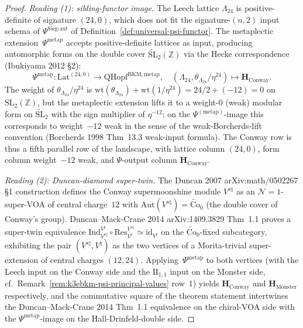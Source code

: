 \begin{proof}[Proof]
\emph{Reading (1): sibling-functor image.}
The Leech lattice $\Lambda_{24}$ is positive-definite of signature
$(24,0)$, which does not fit the signature-$(n,2)$ input schema of
$\Psi^{\mathrm{Sieg\text{-}aut}}$ of
Definition~\ref{def:universal-psi-functor}. The
metaplectic extension~$\Psi^{\mathrm{metap}}$ accepts
positive-definite lattices as input, producing automorphic forms
on the double cover $\widetilde{\mathrm{SL}}_2(\mathbb{Z})$ via the
Hecke correspondence (Ibukiyama 2012 \S 2):
\[
 \Psi^{\mathrm{metap}}:
 \mathrm{Lat}^{(24,0)} \to \mathrm{QHopf}^{\mathrm{BKM,metap}},
 \quad
 (\Lambda_{24}, \theta_{\Lambda_{24}}/\eta^{24}) \mapsto
 \mathbf{H}_{\mathrm{Conway}}.
\]
The weight of $\theta_{\Lambda_{24}}/\eta^{24}$ is
$\mathrm{wt}(\theta_{\Lambda_{24}}) + \mathrm{wt}(1/\eta^{24}) =
24/2 + (-12) = 0$ on $\mathrm{SL}_2(\mathbb{Z})$, but the
metaplectic extension lifts it to a weight-$0$ (weak) modular form
on $\widetilde{\mathrm{SL}}_2$ with the sign multiplier of
$\eta^{-12}$; on the $\Psi^{(\mathrm{metap})}$-image this corresponds
to weight~$-12$ weak in the sense of the weak-Borcherds-lift
convention (Borcherds 1998 Thm~13.3 weak-input formula). The
Conway row is thus a fifth parallel row of the landscape, with
lattice column $(24,0)$, form column weight~$-12$ weak, and
$\Psi$-output column $\mathbf{H}_{\mathrm{Conway}}$.

\emph{Reading (2): Duncan-diamond super-twin.}
The Duncan 2007 arXiv:math/0502267 \S 1 construction defines the
Conway supermoonshine module $V^{s\natural}$ as an
$\mathcal{N} = 1$-super-VOA of central charge~$12$ with
$\mathrm{Aut}(V^{s\natural}) = \widetilde{\mathrm{Co}}_0$
(the double cover of Conway's group). Duncan--Mack-Crane 2014
arXiv:1409.3829 Thm~1.1 proves a super-twin equivalence
$\mathrm{Ind}_{V^{s\natural}}^{V^\natural}\circ
\mathrm{Res}_{V^\natural}^{V^{s\natural}} \simeq \mathrm{id}_{V^\natural}$
on the $\widetilde{\mathrm{Co}}_0$-fixed subcategory, exhibiting
the pair $(V^{s\natural}, V^\natural)$ as the two vertices of a
Morita-trivial super-extension of central charges
$(12, 24)$. Applying~$\Psi^{\mathrm{metap}}$ to both vertices (with
the Leech input on the Conway side and the $\mathrm{II}_{1,1}$
input on the Monster side, cf.\
Remark~\ref{rem:k3ebkm-psi-principal-values} row~1) yields
$\mathbf{H}_{\mathrm{Conway}}$ and $\mathbf{H}_{\mathrm{Monster}}$
respectively, and the commutative square of the theorem statement
intertwines the Duncan--Mack-Crane 2014 Thm~1.1 equivalence on the
chiral-VOA side with the $\Psi^{\mathrm{metap}}$-image on the
Hall-Drinfeld-double side.


\end{proof}
